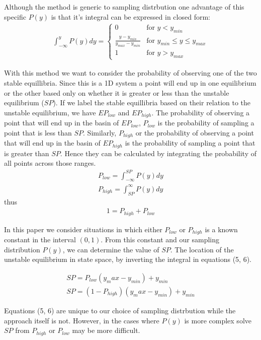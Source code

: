 \documentclass[letterpaper]{article}
\begin{document}
Although the method is generic to sampling distrbution one advantage of this specific
$P(y)$ is that it's integral can be expressed in closed form:
\begin{eqnarray}
  \int_{-\infty}^{y} P(y) dy = 
  \begin{cases}
        0 & \text{for } y < y_{min}\\
        \frac{y-y_{min}}{y_{max} - y_{min}} & \text{for } y_{min}\leq y\leq y_{max}\\
        1 & \text{for } y > y_{max}
  \end{cases}
\end{eqnarray}

With this method we want to consider the probability of observing one of the 
two stable equillibria. Since this is a 1D system a point will end up in one equilibrium
or the other based only on whether it is greater or less than the unstable equilibrium
($SP$).
If we label the stable equillibria based on their relation to the unstable equilibrium,
we have $EP_{low}$ and $EP_{high}$. The probability of observing a point that will end 
up 
in the basin of $EP_{low}$, $P_{low}$ is the probability of sampling a point that is 
less than $SP$. Similarly, $P_{high}$ or the probability of observing a point that 
will end up in the basin of $EP_{high}$ is the probability of sampling a point that is 
greater than $SP$. Hence they can be calculated by integrating the probability of
all points across those ranges.
\begin{eqnarray}
  P_{low} = \int_{-\infty}^{SP} P(y)dy\\
  P_{high} = \int^{\infty}_{SP} P(y)dy
\end{eqnarray}
  thus
\begin{eqnarray}
    1 = P_{high} + P_{low}
\end{eqnarray}

In this paper we consider situations in which either $P_{low}$ or $P_{high}$ is a 
known constant in the interval $(0,1)$. From this constant and our 
sampling distribution $P(y)$, we 
can determine the value of $SP$. The location of the unstable equilibrium in 
state space, by inverting the integral in equations (5, 6).

\begin{eqnarray}
  SP = P_{low}(y_max-y_{min}) + y_{min}\\
  SP = (1-P_{high})(y_max-y_{min}) + y_{min}
\end{eqnarray}

Equations (5, 6) are unique to our choice of sampling distrbution
while the approach itself is not. However, in the cases where $P(y)$
is more complex solve $SP$ from $P_{high}$ or $P_{low}$ may be more
difficult.
\end{document}
